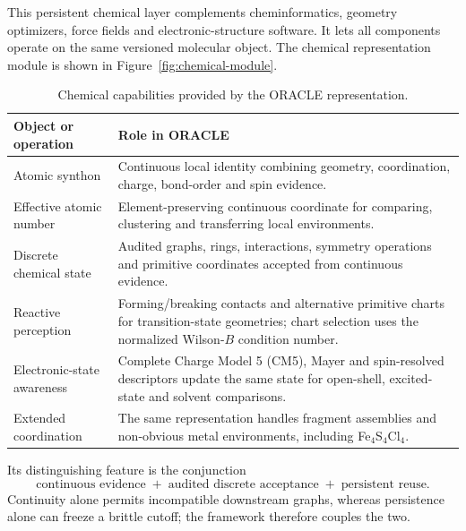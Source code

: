\documentclass[journal=jctcce,manuscript=article]{achemso}
\begin{document}
This persistent chemical layer complements
cheminformatics, geometry optimizers, force fields and electronic-structure
software.  It lets all components operate on the same versioned molecular
object.
The chemical representation module is shown in Figure~\ref{fig:chemical-module}.

\begin{table}[htbp]
\centering
\caption{Chemical capabilities provided by the ORACLE representation.}
\label{tab:oracle-capabilities}
\begin{tabularx}{\textwidth}{>{\raggedright\arraybackslash}p{} X}
\toprule
\textbf{Object or operation} & \textbf{Role in ORACLE}\\
\midrule
Atomic synthon & Continuous local identity combining geometry, coordination,
charge, bond-order and spin evidence.\\
Effective atomic number & Element-preserving continuous coordinate for comparing,
clustering and transferring local environments.\\
Discrete chemical state & Audited graphs, rings, interactions, symmetry operations
and primitive coordinates accepted from continuous evidence.\\
Reactive perception & Forming/breaking contacts and alternative primitive charts
for transition-state geometries; chart selection uses the normalized Wilson-$B$
condition number.\\
Electronic-state awareness & Complete Charge Model 5 (CM5), Mayer and spin-resolved descriptors update the
same state for open-shell, excited-state and solvent comparisons.\\
Extended coordination & The same representation handles fragment assemblies and
non-obvious metal environments, including Fe$_4$S$_4$Cl$_4$.\\
\bottomrule
\end{tabularx}
\end{table}

Its distinguishing feature is the conjunction
\begin{equation}
\text{continuous evidence}
\;+\;\text{audited discrete acceptance}
\;+\;\text{persistent reuse}.
\end{equation}
Continuity alone permits incompatible downstream graphs, whereas persistence
alone can freeze a brittle cutoff; the framework therefore couples the two.
\end{document}
